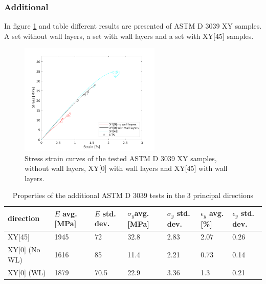 \subsubsection{Additional} 
In figure \ref{fig:ASTM3039WLresults} and table \label{tab:additionalresults} different results are presented of ASTM D 3039 XY samples. A set without wall layers, a set with wall layers and a set with XY[45] samples.
\begin{figure}[H]
    \centering
    \includegraphics[width=0.60\textwidth]{chapter_5_Experimentaltesting/figures/ASTMWLTensiletests.png}
    \caption{Stress strain curves of the tested ASTM D 3039 XY samples, without wall layers, XY[0] with wall layers and XY[45] with wall layers.}
    \label{fig:ASTM3039WLresults}
\end{figure}

\begin{table}
\caption{Properties of the additional ASTM D 3039 tests in the 3 principal directions}
\begin{tabular}{ p{2.5cm}p{1cm}p{1cm}p{1cm}p{1cm}p{1cm}p{1cm}  }
 \hline
direction & $E$ avg. [MPa] & $E$ std. dev. & $\sigma_y$avg. [MPa] & $\sigma_y$ std. dev. & $\epsilon_y$ avg. [\%] & $\epsilon_y$   std. dev. \\
 \hline
XY[45] & 1945 & 72 & 32.8 & 2.83 & 2.07 & 0.26 \\
XY[0] (No WL) & 1616 & 85 & 11.4 & 2.21 & 0.73 & 0.14 \\
XY[0] (WL)& 1879 & 70.5 & 22.9 & 3.36 & 1.3 & 0.21\\
 \hline
\end{tabular}
     \label{tab:additionalresults}
     \end{table}



